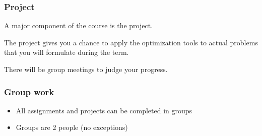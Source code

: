\begin{frame}\frametitle{Project}
	A major component of the course is the project.

	\vspace{12pt}
	The project gives you a chance to apply the optimization tools to actual problems that you will formulate during the term.

	\vspace{12pt}
	There will be group meetings to judge your progress.
\end{frame}

\begin{frame}\frametitle{Group work}
	\begin{itemize}
		\item	All assignments and projects can be completed in groups
		\item	Groups are 2 people (no exceptions)
	\end{itemize}
\end{frame}

